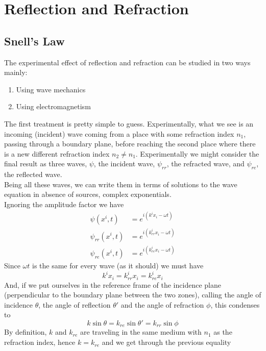 \documentclass[../electromagnetism.tex]{subfiles}
\begin{document}
\section{Reflection and Refraction}
\subsection{Snell's Law}
The experimental effect of reflection and refraction can be studied in two ways mainly:
\begin{enumerate}
\item Using wave mechanics
\item Using electromagnetism
\end{enumerate}
The first treatment is pretty simple to guess. Experimentally, what we see is an incoming (incident) wave coming from a place with some refraction index $n_1$, passing through a boundary plane, before reaching the second place where there is a new different refraction index $n_2\ne n_1$. Experimentally we might consider the final result as three waves, $\psi$, the incident wave, $\psi_{rr}$, the refracted wave, and $\psi_{re}$, the reflected wave.\\
Being all these waves, we can write them in terms of solutions to the wave equation in absence of sources, complex exponentials.\\
Ignoring the amplitude factor we have
\begin{equation}
	\begin{aligned}
		\psi(x^i,t)&= e^{i\left( k^ix_i-\omega t \right)}\\
		\psi_{rr}(x^i,t)&= e^{i\left( k^i_{rr}x_i-\omega t \right)}\\
		\psi_{re}(x^i,t)&= e^{i\left( k^i_{re}x_i-\omega t \right)}
	\end{aligned}
	\label{eq:snellwaves}
\end{equation}
Since $\omega t$ is the same for every wave (as it should) we must have
\begin{equation*}
	k^ix_i=k^i_{rr}x_i=k^i_{re}x_i
\end{equation*}
And, if we put ourselves in the reference frame of the incidence plane (perpendicular to the boundary plane between the two zones), calling the angle of incidence $\theta$, the angle of reflection $\theta'$ and the angle of refraction $\phi$, this condenses to
\begin{equation}
	k\sin\theta=k_{re}\sin\theta'=k_{rr}\sin\phi
	\label{eq:snellsines}
\end{equation}
By definition, $k$ and $k_{re}$ are traveling in the same medium with $n_1$ as the refraction index, hence $k=k_{re}$ and we get through the previous equality 
\end{document}
